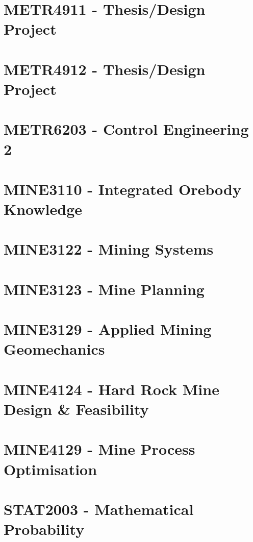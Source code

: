 \documentclass[a4paper,12pt]{report}
\begin{document}
\hypertarget{METR4911}{\section{METR4911 - Thesis/Design Project}}

\hypertarget{METR4912}{\section{METR4912 - Thesis/Design Project}}

\hypertarget{METR6203}{\section{METR6203 - Control Engineering 2}}

\hypertarget{MINE3110}{\section{MINE3110 - Integrated Orebody Knowledge}}

\hypertarget{MINE3122}{\section{MINE3122 - Mining Systems}}

\hypertarget{MINE3123}{\section{MINE3123 - Mine Planning}}

\hypertarget{MINE3129}{\section{MINE3129 - Applied Mining Geomechanics}}

\hypertarget{MINE4124}{\section{MINE4124 - Hard Rock Mine Design \& Feasibility}}

\hypertarget{MINE4129}{\section{MINE4129 - Mine Process Optimisation}}

\hypertarget{STAT2003}{\section{STAT2003 - Mathematical Probability}}
\end{document}
